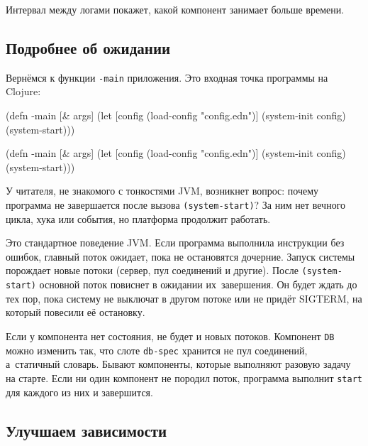 Интервал между логами покажет, какой компонент занимает больше времени.

\subsection{Подробнее об ожидании}


Вернёмся к функции \verb|-main| приложения. Это входная точка программы на
Clojure:

\ifnarrow

\begin{english}
  \begin{clojure}
(defn -main [& args]
  (let [config
        (load-config "config.edn")]
    (system-init config)
    (system-start)))
  \end{clojure}
\end{english}

\else

\begin{english}
  \begin{clojure}
(defn -main [& args]
  (let [config (load-config "config.edn")]
    (system-init config)
    (system-start)))
  \end{clojure}
\end{english}

\fi

У читателя, не знакомого с тонкостями JVM, возникнет вопрос: почему программа не
завершается после вызова \verb|(system-start)|? За ним нет вечного цикла, хука
или события, но платформа продолжит работать.


Это стандартное поведение JVM. Если программа выполнила инструкции без ошибок,
главный поток ожидает, пока не остановятся дочерние. Запуск системы порождает
новые потоки (сервер, пул соединений и другие). После \verb|(system-start)|
основной поток повиснет в ожидании их~завершения. Он будет ждать до тех пор,
пока систему не выключат в другом потоке или не придёт SIGTERM, на который
повесили её остановку.

Если у компонента нет состояния, не будет и новых потоков. Компонент \verb|DB|
можно изменить так, что слоте \verb|db-spec| хранится не пул соединений,
а~статичный словарь. Бывают компоненты, которые выполняют разовую задачу на
старте. Если ни один компонент не породил поток, программа выполнит \verb|start|
для каждого из них и завершится.

\subsection{Улучшаем зависимости}

